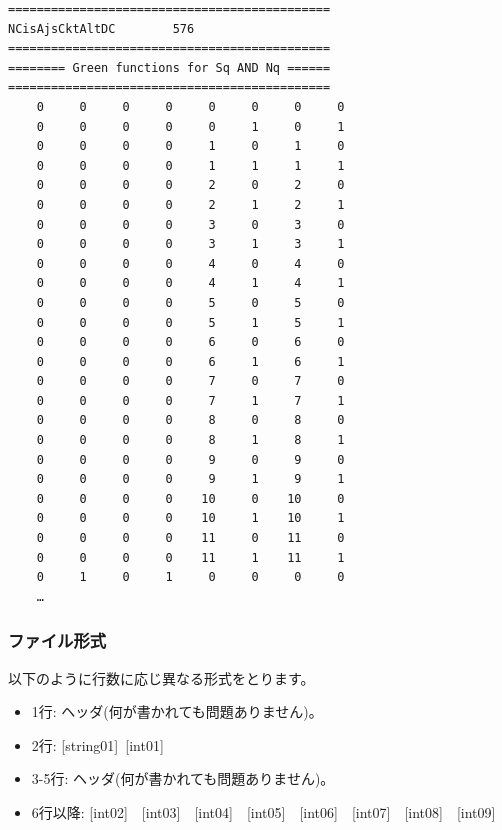 \begin{minipage}{12.5cm}
\begin{screen}
\begin{verbatim}
=============================================
NCisAjsCktAltDC        576
=============================================
======== Green functions for Sq AND Nq ======
=============================================
    0     0     0     0     0     0     0     0
    0     0     0     0     0     1     0     1
    0     0     0     0     1     0     1     0
    0     0     0     0     1     1     1     1
    0     0     0     0     2     0     2     0
    0     0     0     0     2     1     2     1
    0     0     0     0     3     0     3     0
    0     0     0     0     3     1     3     1
    0     0     0     0     4     0     4     0
    0     0     0     0     4     1     4     1
    0     0     0     0     5     0     5     0
    0     0     0     0     5     1     5     1
    0     0     0     0     6     0     6     0
    0     0     0     0     6     1     6     1
    0     0     0     0     7     0     7     0
    0     0     0     0     7     1     7     1
    0     0     0     0     8     0     8     0
    0     0     0     0     8     1     8     1
    0     0     0     0     9     0     9     0
    0     0     0     0     9     1     9     1
    0     0     0     0    10     0    10     0
    0     0     0     0    10     1    10     1
    0     0     0     0    11     0    11     0
    0     0     0     0    11     1    11     1
    0     1     0     1     0     0     0     0
    …
\end{verbatim}
\end{screen}
\end{minipage}

\subsubsection{ファイル形式}
以下のように行数に応じ異なる形式をとります。
 \begin{itemize}
   \item  1行:  ヘッダ(何が書かれても問題ありません)。
   \item  2行:   [string01]~[int01]
   \item  3-5行:  ヘッダ(何が書かれても問題ありません)。
   \item  6行以降: [int02]~~[int03]~~[int04]~~[int05]~~[int06]~~[int07]~~[int08]~~[int09]
  \end{itemize}
